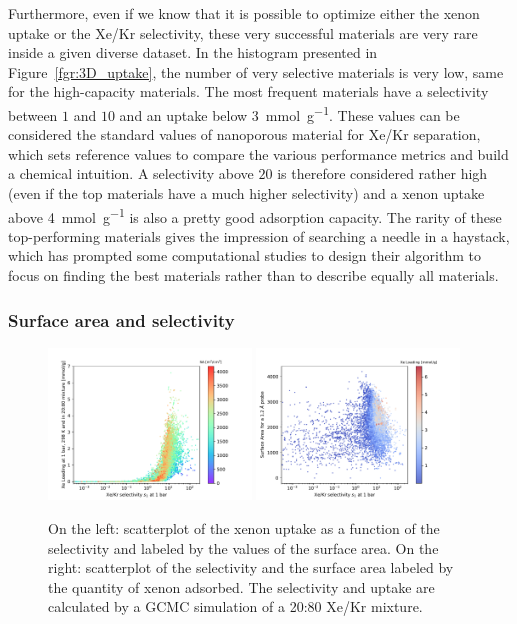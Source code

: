 \documentclass[main.tex]{subfiles}
\begin{document}
Furthermore, even if we know that it is possible to optimize either the xenon uptake or the Xe/Kr selectivity, these very successful materials are very rare inside a given diverse dataset. In the histogram presented in Figure~\ref{fgr:3D_uptake}, the number of very selective materials is very low, same for the high-capacity materials. The most frequent materials have a selectivity between $1$ and $10$ and an uptake below \SI{3}{\milli\mole\per\gram}. These values can be considered the standard values of nanoporous material for Xe/Kr separation, which sets reference values to compare the various performance metrics and build a chemical intuition. A selectivity above $20$ is therefore considered rather high (even if the top materials have a much higher selectivity\autocite{Pei_2022}) and a xenon uptake above \SI{4}{\milli\mole\per\gram} is also a pretty good adsorption capacity. The rarity of these top-performing materials gives the impression of searching a needle in a haystack, which has prompted some computational studies to design their algorithm to focus on finding the best materials rather than to describe equally all materials.\autocite{Deshwal_2021,Glasby_2021} 

\subsubsection{Surface area and selectivity}

\begin{figure}[h!]
  \centering
  \includegraphics[width=0.48\textwidth]{figures/2-thermo/Scatterplot_uptake_selectivity_sa.pdf}
  \includegraphics[width=0.48\textwidth]{figures/2-thermo/Scatterplot_sa_selectivity.pdf}
  \caption{On the left: scatterplot of the xenon uptake as a function of the selectivity and labeled by the values of the surface area. On the right: scatterplot of the selectivity and the surface area labeled by the quantity of xenon adsorbed. The selectivity and uptake are calculated by a GCMC simulation of a 20:80 Xe/Kr mixture.}\label{fgr:sa}
\end{figure}
\end{document}
